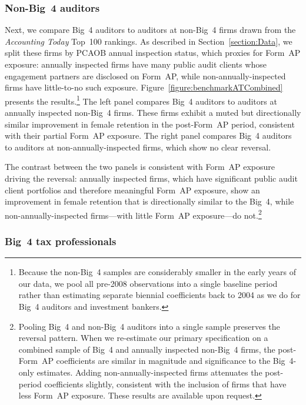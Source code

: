 \documentclass[11pt]{article}
\begin{document}
        \subsubsection{Non-Big~4 auditors}

            Next, we compare Big~4 auditors to auditors at non-Big~4 firms drawn from the \textit{Accounting Today} Top~100 rankings. As described in Section~\ref{section:Data}, we split these firms by PCAOB annual inspection status, which proxies for Form~AP exposure: annually inspected firms have many public audit clients whose engagement partners are disclosed on Form~AP, while non-annually-inspected firms have little-to-no such exposure. Figure~\ref{figure:benchmarkATCombined} presents the results.\footnote{Because the non-Big~4 samples are considerably smaller in the early years of our data, we pool all pre-2008 observations into a single baseline period rather than estimating separate biennial coefficients back to 2004 as we do for Big~4 auditors and investment bankers.} The left panel compares Big~4 auditors to auditors at annually inspected non-Big~4 firms. These firms exhibit a muted but directionally similar improvement in female retention in the post-Form~AP period, consistent with their partial Form~AP exposure. The right panel compares Big~4 auditors to auditors at non-annually-inspected firms, which show no clear reversal.

            The contrast between the two panels is consistent with Form~AP exposure driving the reversal: annually inspected firms, which have significant public audit client portfolios and therefore meaningful Form~AP exposure, show an improvement in female retention that is directionally similar to the Big~4, while non-annually-inspected firms---with little Form~AP exposure---do not.\footnote{Pooling Big~4 and non-Big~4 auditors into a single sample preserves the reversal pattern. When we re-estimate our primary specification on a combined sample of Big~4 and annually inspected non-Big~4 firms, the post-Form~AP coefficients are similar in magnitude and significance to the Big~4-only estimates. Adding non-annually-inspected firms attenuates the post-period coefficients slightly, consistent with the inclusion of firms that have less Form~AP exposure. These results are available upon request.}

        \subsubsection{Big~4 tax professionals}
\end{document}
